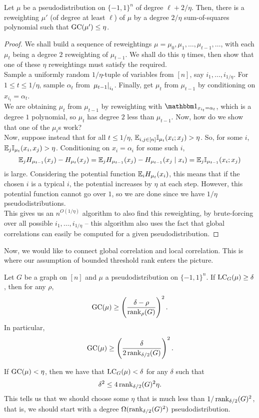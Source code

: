 	\begin{flem}
		Let $\mu$ be a pseudodistribution on $\{-1,1\}^n$ of degree $\ell + 2/\eta$. Then, there is a reweighting $\mu'$ (of degree at least $\ell$) of $\mu$ by a degree $2/\eta$ sum-of-squares polynomial such that $\operatorname{GC}(\mu') \le \eta$.
	\end{flem}
	\begin{proof}
		We shall build a sequence of reweightings $\mu = \mu_0, \mu_1, \ldots, \mu_{t-1}, \ldots$, with each $\mu_t$ being a degree $2$ reweighting of $\mu_{t-1}$. We shall do this $\eta$ times, then show that one of these $\eta$ reweightings must satisfy the required.\\
		Sample a uniformly random $1/\eta$-tuple of variables from $[n]$, say $i_1,\ldots,i_{1/\eta}$. For $1 \le t \le 1/\eta$, sample $\alpha_{t}$ from $\left.\mu_{t-1}\right|_{i_t}$. Finally, get $\mu_t$ from $\mu_{t-1}$ by conditioning on $x_{i_t} = \alpha_t$.\\
		We are obtaining $\mu_t$ from $\mu_{t-1}$ by reweighting with $\indic_{x_{i_t} = \alpha_t}$, which is a degree $1$ polynomial, so $\mu_t$ has degree $2$ less than $\mu_{t-1}$. Now, how do we show that one of the $\mu_i$s work?\\

		Now, suppose instead that for all $t \le 1/\eta$, $\mathbb{E}_{i,j \in [n]} \mathbb{I}_{\mu_t}(x_i;x_j) > \eta$. So, for some $i$, $\mathbb{E}_{j} \mathbb{I}_{\mu_t}(x_i,x_j) > \eta$. Conditioning on $x_i = \alpha_i$ for some such $i$,
		\[ \mathbb{E}_j H_{\mu_{t-1}}(x_j) - H_{\mu_t}(x_j) = \mathbb{E}_j H_{\mu_{t-1}}(x_j) - H_{\mu_{t-1}}(x_j \mid x_i) = \mathbb{E}_j \mathbb{I}_{\mu_{t-1}}(x_i;x_j) \]
		is large. Considering the potential function $\mathbb{E}_i H_{\mu_t} (x_i)$, this means that if the chosen $i$ is a typical $i$, the potential increases by $\eta$ at each step. However, this potential function cannot go over $1$, so we are done since we have $1/\eta$ pseudodistributions.\\
		This gives us an $n^{O(1/\eta)}$ algorithm to also find this reweighting, by brute-forcing over all possible $i_1,\ldots,i_{1/\eta}$ -- this algorithm also uses the fact that global correlations can easily be computed for a given pseudodistribution.
	\end{proof}

	Now, we would like to connect global correlation and local correlation. This is where our assumption of bounded threshold rank enters the picture.

	\begin{flem}
		Let $G$ be a graph on $[n]$ and $\mu$ a pseudodistribution on $\{-1,1\}^n$. If $\operatorname{LC}_G(\mu) \ge \delta$, then for any $\rho$,
		\[ \operatorname{GC}(\mu) \ge \left( \frac{\delta-\rho}{\operatorname{rank}_\rho(G)} \right)^2. \]
		In particular,
		\[ \operatorname{GC}(\mu) \ge \left(\frac{\delta}{2\operatorname{rank}_{\delta/2}(G)}\right)^2. \]
	\end{flem}
	If $\operatorname{GC}(\mu) < \eta$, then we have that $\operatorname{LC}_G(\mu) < \delta$ for any $\delta$ such that
	\[ \delta^2 \le 4 \operatorname{rank}_{\delta/2}(G)^2 \eta. \]
	This tells us that we should choose some $\eta$ that is much less than $1/\operatorname{rank}_{\delta/2}(G)^2$, that is, we should start with a degree $\Omega(\operatorname{rank}_{\delta/2}(G)^2)$ pseudodistribution. 

